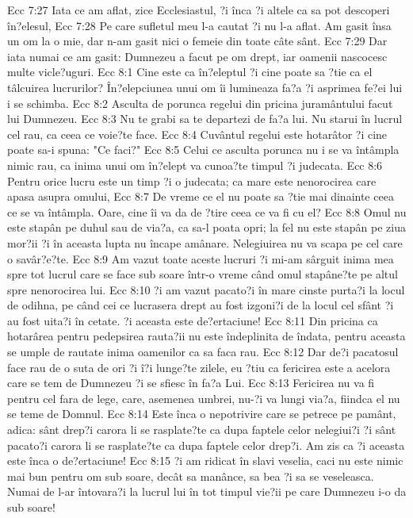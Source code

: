 Ecc 7:27  Iata ce am aflat, zice Ecclesiastul, ?i înca ?i altele ca sa pot descoperi în?elesul,
Ecc 7:28  Pe care sufletul meu l-a cautat ?i nu l-a aflat. Am gasit însa un om la o mie, dar n-am gasit nici o femeie din toate câte sânt.
Ecc 7:29  Dar iata numai ce am gasit: Dumnezeu a facut pe om drept, iar oamenii nascocesc multe vicle?uguri.
Ecc 8:1  Cine este ca în?eleptul ?i cine poate sa ?tie ca el tâlcuirea lucrurilor? În?elepciunea unui om îi lumineaza fa?a ?i asprimea fe?ei lui i se schimba.
Ecc 8:2  Asculta de porunca regelui din pricina juramântului facut lui Dumnezeu.
Ecc 8:3  Nu te grabi sa te departezi de fa?a lui. Nu starui în lucrul cel rau, ca ceea ce voie?te face.
Ecc 8:4  Cuvântul regelui este hotarâtor ?i cine poate sa-i spuna: "Ce faci?"
Ecc 8:5  Celui ce asculta porunca nu i se va întâmpla nimic rau, ca inima unui om în?elept va cunoa?te timpul ?i judecata.
Ecc 8:6  Pentru orice lucru este un timp ?i o judecata; ca mare este nenorocirea care apasa asupra omului,
Ecc 8:7  De vreme ce el nu poate sa ?tie mai dinainte ceea ce se va întâmpla. Oare, cine îi va da de ?tire ceea ce va fi cu el?
Ecc 8:8  Omul nu este stapân pe duhul sau de via?a, ca sa-l poata opri; la fel nu este stapân pe ziua mor?ii ?i în aceasta lupta nu încape amânare. Nelegiuirea nu va scapa pe cel care o savâr?e?te.
Ecc 8:9  Am vazut toate aceste lucruri ?i mi-am sârguit inima mea spre tot lucrul care se face sub soare într-o vreme când omul stapâne?te pe altul spre nenorocirea lui.
Ecc 8:10  ?i am vazut pacato?i în mare cinste purta?i la locul de odihna, pe când cei ce lucrasera drept au fost izgoni?i de la locul cel sfânt ?i au fost uita?i în cetate. ?i aceasta este de?ertaciune!
Ecc 8:11  Din pricina ca hotarârea pentru pedepsirea rauta?ii nu este îndeplinita de îndata, pentru aceasta se umple de rautate inima oamenilor ca sa faca rau.
Ecc 8:12  Dar de?i pacatosul face rau de o suta de ori ?i î?i lunge?te zilele, eu ?tiu ca fericirea este a acelora care se tem de Dumnezeu ?i se sfiesc în fa?a Lui.
Ecc 8:13  Fericirea nu va fi pentru cel fara de lege, care, asemenea umbrei, nu-?i va lungi via?a, fiindca el nu se teme de Domnul.
Ecc 8:14  Este înca o nepotrivire care se petrece pe pamânt, adica: sânt drep?i carora li se rasplate?te ca dupa faptele celor nelegiui?i ?i sânt pacato?i carora li se rasplate?te ca dupa faptele celor drep?i. Am zis ca ?i aceasta este înca o de?ertaciune!
Ecc 8:15  ?i am ridicat în slavi veselia, caci nu este nimic mai bun pentru om sub soare, decât sa manânce, sa bea ?i sa se veseleasca. Numai de l-ar întovara?i la lucrul lui în tot timpul vie?ii pe care Dumnezeu i-o da sub soare!
